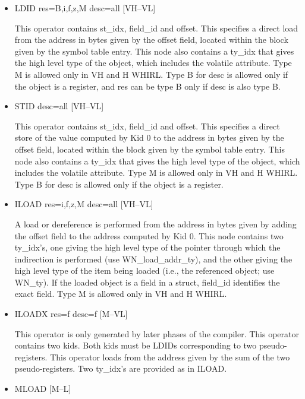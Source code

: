 \begin{itemize}

\item
{}%
LDID res=B,i,f,z,M desc=all \hfill [VH--VL]

This operator contains st\_idx, field\_id and offset. This specifies
a direct load from the address in bytes given by the offset field,
located within the
block given by the symbol table entry. This node also contains a
ty\_idx that gives the high level type of the object, which includes
the volatile attribute. Type M is allowed only in VH and H WHIRL.
Type B for desc is allowed only if the object is a register, and
res can be type B only if desc is also type B. 

\item
{}%
STID desc=all \hfill [VH--VL]

This operator contains st\_idx, field\_id and offset. This specifies
a direct store of the value computed by Kid 0 to the address in
bytes given by the
offset field, located within the block given by the symbol table
entry. This node also contains a ty\_idx that gives the high level
type of the object, which includes the volatile attribute. Type M
is allowed only in VH and H WHIRL. Type B for desc is allowed only
if the object is a register.

\item
{}%
ILOAD res=i,f,z,M desc=all \hfill [VH--VL]

A load or dereference is performed from the address in bytes given by
adding the offset field to the address computed by Kid 0. This node
contains two ty\_idx's, one giving the high level type of the pointer
through which the indirection is performed (use WN\_load\_addr\_ty),
and the other giving the high level type of the item being loaded
(i.e., the referenced object; use WN\_ty). If the loaded object is a
field in a struct, field\_id identifies the exact field.  Type M is
allowed only in VH and H WHIRL.

\item
{}%
ILOADX res=f desc=f \hfill [M--VL]

This operator is only generated by later phases of the compiler.
This operator contains two kids. Both kids must be
%
LDIDs corresponding to two
pseudo-registers. This operator loads from the address
given by the sum of the two pseudo-registers. Two ty\_idx's are
provided as in
%
ILOAD.

\item
{}%
MLOAD \hfill [M--L]


\end{itemize}
